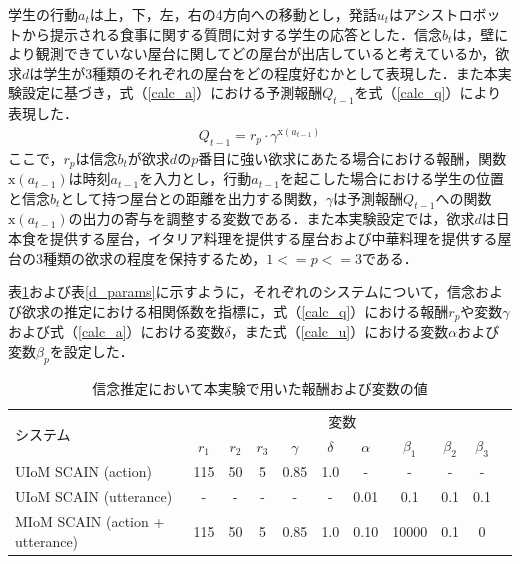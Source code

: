 \par
学生の行動$a_t$は上，下，左，右の4方向への移動とし，発話$u_t$はアシストロボットから提示される食事に関する質問に対する学生の応答とした．信念$b_t$は，壁により観測できていない屋台に関してどの屋台が出店していると考えているか，欲求$d$は学生が3種類のそれぞれの屋台をどの程度好むかとして表現した．また本実験設定に基づき，式（\ref{calc_a}）における予測報酬$Q_{t-1}$を式（\ref{calc_q}）により表現した．
\begin{equation}
  \begin{split}
  \label{calc_q}
  Q_{t-1}=r_p\cdot \gamma^{\mathrm{x}(a_{t-1})}
  \end{split}
\end{equation}
ここで，$r_p$は信念$b_{t}$が欲求$d$の$p$番目に強い欲求にあたる場合における報酬，関数$\mathrm{x}(a_{t-1})$は時刻$a_{t-1}$を入力とし，行動$a_{t-1}$を起こした場合における学生の位置と信念$b_{t}$として持つ屋台との距離を出力する関数，$\gamma$は予測報酬$Q_{t-1}$への関数$\mathrm{x}(a_{t-1})$の出力の寄与を調整する変数である．また本実験設定では，欲求$d$は日本食を提供する屋台，イタリア料理を提供する屋台および中華料理を提供する屋台の3種類の欲求の程度を保持するため，$1<=p<=3$である．
\par
表\ref{b_params}および表\ref{d_params}に示すように，それぞれのシステムについて，信念および欲求の推定における相関係数を指標に，式（\ref{calc_q}）における報酬$r_p$や変数$\gamma$および式（\ref{calc_a}）における変数$\delta$，また式（\ref{calc_u}）における変数$\alpha$および変数$\beta_p$を設定した．
\begin{table}[htb]
  \begin{center}
  \caption{信念推定において本実験で用いた報酬および変数の値}
  \label{b_params}
  \begin{tabular}{lcccccccccc} \hline
    \multirow{2}{*}{システム}&\multicolumn{9}{c}{変数}\\\cline{2-10}
    & $r_1$& $r_2$&$r_3$&$\gamma$&$\delta$&$\alpha$&$\beta_1$&$\beta_2$&$\beta_3$\\ \hline
    UIoM SCAIN (action)&115&50&5&0.85&1.0&-&-&-&-\\
    UIoM SCAIN (utterance)&-&-&-&-&-&0.01&0.1&0.1&0.1\\
    MIoM SCAIN (action + utterance)&115&50&5&0.85&1.0&0.10&10000&0.1&0\\\hline
  \end{tabular}
\end{center}
\end{table}

